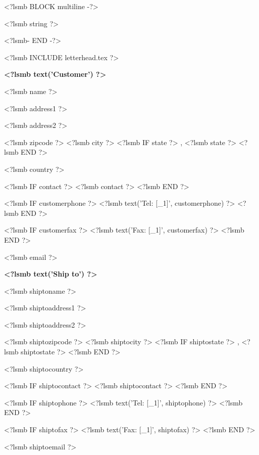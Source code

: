 \documentclass{scrartcl}
\begin{document}
\pagestyle{myheadings}
\thispagestyle{empty}

<?lsmb BLOCK multiline -?>
\begin{minipage}{12cm}
\medskip
\raggedright
<?lsmb string ?>
\end{minipage}
<?lsmb- END -?>

<?lsmb INCLUDE letterhead.tex ?>


\vspace*{0.2cm}

\parbox[t]{.5\textwidth}{
\textbf{<?lsmb text('Customer') ?>}
\vspace{0.3cm}
  
<?lsmb name ?>

<?lsmb address1 ?>

<?lsmb address2 ?>

<?lsmb zipcode ?> <?lsmb city ?>
<?lsmb IF state ?>
\hspace{-0.1cm}, <?lsmb state ?>
<?lsmb END ?>

<?lsmb country ?>

\vspace{0.3cm}

<?lsmb IF contact ?>
<?lsmb contact ?>
\vspace{0.2cm}
<?lsmb END ?>

<?lsmb IF customerphone ?>
<?lsmb text('Tel: [_1]', customerphone) ?>
<?lsmb END ?>

<?lsmb IF customerfax ?>
<?lsmb text('Fax: [_1]', customerfax) ?>
<?lsmb END ?>

<?lsmb email ?>
}
\parbox[t]{.5\textwidth}{
\textbf{<?lsmb text('Ship to') ?>}
\vspace{0.3cm}

<?lsmb shiptoname ?>

<?lsmb shiptoaddress1 ?>

<?lsmb shiptoaddress2 ?>

<?lsmb shiptozipcode ?> <?lsmb shiptocity ?>
<?lsmb IF shiptostate ?>
\hspace{-0.1cm}, <?lsmb shiptostate ?>
<?lsmb END ?>

<?lsmb shiptocountry ?>

\vspace{0.3cm}

<?lsmb IF shiptocontact ?>
<?lsmb shiptocontact ?>
\vspace{0.2cm}
<?lsmb END ?>

<?lsmb IF shiptophone ?>
<?lsmb text('Tel: [_1]', shiptophone) ?>
<?lsmb END ?>

<?lsmb IF shiptofax ?>
<?lsmb text('Fax: [_1]', shiptofax) ?>
<?lsmb END ?>

<?lsmb shiptoemail ?>
}
\hfill
\end{document}
